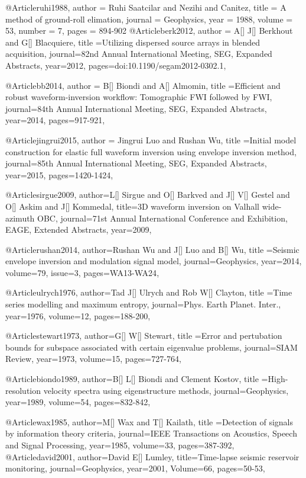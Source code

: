 @Article{ruhi1988,
  author = 	 {Ruhi Saatcilar and Nezihi and Canitez},
  title = 	 {A method of ground-roll elimation},
  journal = 	 {Geophysics},
  year = 	 1988,
  volume = 	 53,
  number = 	 7,
  pages = 	 {894-902}}
@Article{berk2012,
  author = {A[] J[] Berkhout and G[] Blacquiere},
  title ={Utilizing dispersed source arrays in blended acquisition},
  journal={82nd Annual International Meeting, SEG, Expanded Abstracts},
  year=2012,
  pages={doi:10.1190/segam2012-0302.1},
}



@Article{bb2014,
  author = {B[] Biondi and A[] Almomin},
  title ={Efficient and robust waveform-inversion workflow: Tomographic FWI followed by FWI},
  journal={84th Annual International Meeting, SEG, Expanded Abstracts},
  year=2014,
  pages={917-921},
}

@Article{jingrui2015,
  author = {Jingrui Luo and Rushan Wu},
  title ={Initial model construction for elastic full waveform inversion using envelope inversion method},
  journal={85th Annual International Meeting, SEG, Expanded Abstracts},
  year=2015,
  pages={1420-1424},
}

@Article{sirgue2009,
  author={L[] Sirgue and O[] Barkved and J[] V[] Gestel and O[] Askim and J[] Kommedal},
  title={3{D} waveform inversion on Valhall wide-azimuth {OBC}},
  journal={71st Annual International Conference and Exhibition, EAGE, Extended Abstracts},
  year=2009,
}

@Article{rushan2014,
  author={Rushan Wu and J[] Luo and B[] Wu},
  title ={Seismic envelope inversion and modulation signal model},
  journal={Geophysics},
  year=2014,
  volume=79,
  issue=3,
  pages={WA13-WA24},
}



@Article{ulrych1976,
  author={Tad J[] Ulrych and Rob W[] Clayton},
  title ={Time series modelling and maximum entropy},
  journal={Phys. Earth Planet. Inter.},
  year=1976,
  volume=12,
  pages={188-200},
}

@Article{stewart1973,
  author={G[] W[] Stewart},
  title ={Error and pertubation bounds for subspace associated with certain eigenvalue problems},
  journal={SIAM Review},
  year=1973,
  volume=15,
  pages={727-764},
}

@Article{biondo1989,
  author={B[] L[] Biondi and Clement Kostov},
  title ={High-resolution velocity spectra using eigenstructure methods},
  journal={Geophysics},
  year=1989,
  volume=54,
  pages={832-842},
}

@Article{wax1985,
  author={M[] Wax and T[] Kailath},
  title ={Detection of signals by information theory criteria},
  journal={IEEE Transactions on Acoustics, Speech and Signal Processing},
  year=1985,
  volume=33,
  pages={387-392},
}
@Article{david2001,
  author={David E[] Lumley},
  title={Time-lapse seismic reservoir monitoring},
  journal={Geophysics},
  year=2001,
  Volume=66,
  pages={50-53},
}


